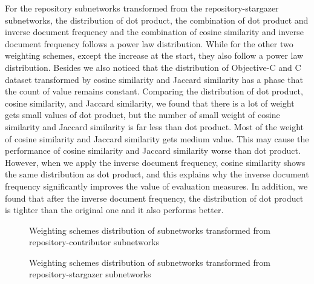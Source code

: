 \documentclass[12pt,oneside,final]{vlsithesis}
\begin{document}
For the repository subnetworks transformed from the repository-stargazer subnetworks, the distribution of dot product, the combination of dot product and inverse document frequency and the combination of cosine similarity and inverse document frequency follows a power law distribution. While for the other two weighting schemes, except the increase at the start, they also follow a power law distribution. Besides we also noticed that the distribution of Objective-C and C dataset transformed by cosine similarity and Jaccard similarity has a phase that the count of value remains constant.  Comparing the distribution of dot product, cosine similarity, and Jaccard similarity, we found that there is a lot of weight gets small values of dot product, but the number of small weight of cosine similarity and Jaccard similarity is far less than dot product. Most of the weight of cosine similarity and Jaccard similarity gets medium value. This may cause the performance of cosine similarity and Jaccard similarity worse than dot product. However, when we apply the inverse document frequency, cosine similarity shows the same distribution as dot product, and this explains why the inverse document frequency significantly improves the value of evaluation measures. In addition, we found that after the inverse document frequency, the distribution of dot product is tighter than the original one and it also performs better. 
\begin{figure*}
	\centering
	\caption{Weighting schemes distribution of subnetworks transformed from repository-contributor subnetworks}
	\label{fig:weight degree distribution of repository-contributor}
\end{figure*}


\begin{figure*}
	\centering
	\caption{Weighting schemes distribution of subnetworks transformed from repository-stargazer subnetworks}
	\label{fig:weight degree distribution of repository-stargazer}
\end{figure*}
\end{document}
